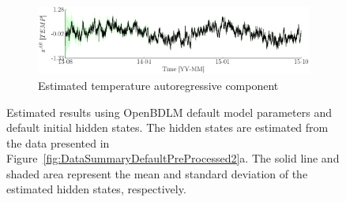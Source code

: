 \begin{figure}[h!]
\begin{subfigure}{\linewidth}
\includegraphics[width=0.9\linewidth]{./docfigs/Example_DISPTEMPSIM/default/TEMP_AR_6.pdf} 
\caption{Estimated temperature autoregressive component}
\end{subfigure}
\caption{Estimated results using OpenBDLM default model parameters and default initial hidden states. The hidden states are estimated from the data presented in Figure~\ref{fig:DataSummaryDefaultPreProcessed2}a. The solid line and shaded area represent the mean and standard deviation of the estimated hidden states, respectively.}
\label{fig:DISPTEMPSIMDefaultDefaultExample2}
\end{figure}

